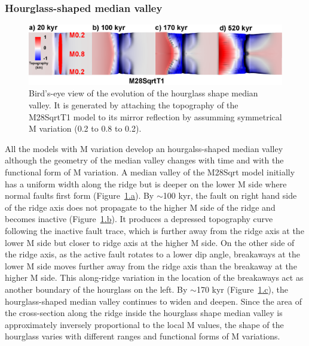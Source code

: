 \subsubsection{Hourglass-shaped median valley}

\begin{figure}[h]
  \centering
    \includegraphics[width=1.0\textwidth]{./Figures/fig_Results_3_2_hourglass_evolution.eps}
  \caption{Bird's-eye view of the evolution of the hourglass shape median valley. It is generated by attaching the topography of the M28SqrtT1 model to its mirror reflection by assumming symmetrical M variation (0.2 to 0.8 to 0.2). }
 \label{fig_Results_3_2_hourglass_evolution}
\end{figure}

All the models with M variation develop an hourgalss-shaped median valley although the geometry of the median valley changes with time and with the functional form of M variation. %
A median valley of the M28Sqrt model initially has a uniform width along the ridge but is deeper on the lower M side where normal faults first form (Figure~\hyperref[fig_Results_3_2_hourglass_evolution]{\ref{fig_Results_3_2_hourglass_evolution}.a}). By $\sim$100 kyr, the fault on right hand side of the ridge axis does not propagate to the higher M side of the ridge and becomes inactive (Figure~\hyperref[fig_Results_3_2_hourglass_evolution]{\ref{fig_Results_3_2_hourglass_evolution}.b}). It produces a depressed topography curve following the inactive fault trace, which is further away from the ridge axis at the lower M side but closer to ridge axis at the higher M side. On the other side of the ridge axis, as the active fault rotates to a lower dip angle, breakaways at the lower M side moves further away from the ridge axis than the breakaway at the higher M side. This along-ridge variation in the location of the breakaways act as another boundary of the hourglass on the left. %
By $\sim$170 kyr (Figure~\hyperref[fig_Results_3_2_hourglass_evolution]{\ref{fig_Results_3_2_hourglass_evolution}.c}), the hourglass-shaped median valley continues to widen and deepen. Since the area of the cross-section along the ridge inside the hourglass shape median valley is approximately inversely proportional to the local M values, the shape of the hourglass varies with different ranges and functional forms of M variations.

